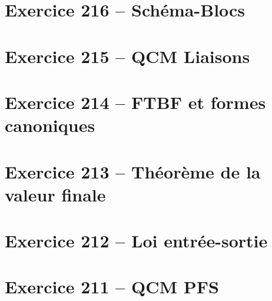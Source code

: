 \documentclass[10pt,fleqn]{article} %
\begin{document}


\vspace{1cm}

\pagestyle{fancy}
\thispagestyle{plain}

\def\columnseprulecolor{\color{ocre}}
\setlength{\columnseprule}{0.4pt} 



\newcommand{\repex}{repex}

\begin{multicols}{2}
\section*{Exercice 216 -- Schéma-Blocs}
\renewcommand{\repex}{001_SchemaBlocs}
\graphicspath{{\repex/images/}}


\section*{Exercice 215 -- QCM Liaisons}
\renewcommand{\repex}{020_QCM_Liaisons}
\graphicspath{{\repex/images/}}


\section*{Exercice 214 -- FTBF et formes canoniques}
\renewcommand{\repex}{002_FTBF_Canonique}
\graphicspath{{\repex/images/}}


\section*{Exercice 213 -- Théorème de la valeur finale}
\renewcommand{\repex}{003_ValeurFinale}
\graphicspath{{\repex/images/}}


\section*{Exercice 212 -- Loi entrée-sortie}
\renewcommand{\repex}{014_LoiES}
\graphicspath{{\repex/images/}}


\section*{Exercice 211 -- QCM PFS}
\renewcommand{\repex}{021_QCM_PFS}
\graphicspath{{\repex/images/}}



\end{multicols}
\end{document}
